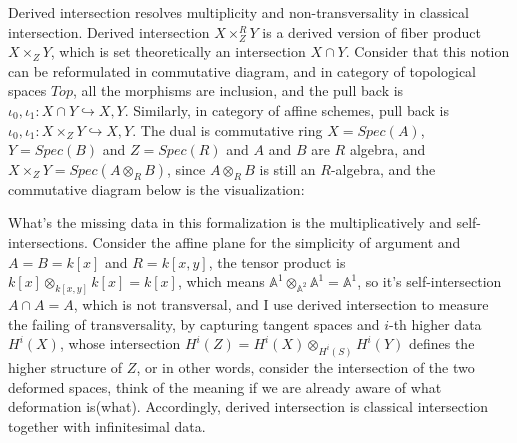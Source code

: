 \documentclass{article}
\begin{document}
\noindent
Derived intersection resolves multiplicity and non-transversality in classical intersection.
Derived intersection $X\times_Z^R Y$ is a derived version of fiber product $X \times_Z Y$, 
which is set theoretically an intersection $X\cap Y$.
Consider that this notion can be reformulated in commutative diagram, and in category of topological spaces $Top$, 
all the morphisms are inclusion, and the pull back is $\iota_0, \iota_1:X\cap Y\hookrightarrow X,Y$. 
Similarly, in category of affine schemes, pull back is $\iota_0, \iota_1:X\times_Z Y\hookrightarrow X,Y$.
The dual is commutative ring $X=Spec(A)$, $Y=Spec(B)$ and $Z=Spec(R)$ and $A$ and $B$ are $R$ algebra,
and $X\times_Z Y = Spec(A\otimes_R B)$, since $A\otimes_R B$ is still an $R$-algebra,
and the commutative diagram below is the visualization: \\

\qquad
{}

\noindent
What's the missing data in this formalization is the multiplicatively and self-intersections.
Consider the affine plane for the simplicity of argument and $A=B=k[x]$ and $R=k[x,y]$,
the tensor product is $k[x]\otimes_{k[x,y]}k[x] = k[x]$, which means $\mathbb{A}^1 \otimes_{\mathbb{A}^2} \mathbb{A}^1=\mathbb{A}^1$,
so it's self-intersection $A\cap A=A$, which is not transversal,
and I use derived intersection to measure the failing of transversality, by capturing tangent spaces and $i$-th higher data $H^i(X)$, 
whose intersection $H^i(Z) = H^i(X) \otimes_{H^i(S)} H^i(Y)$ defines the higher structure of $Z$,
or in other words, consider the intersection of the two deformed spaces, 
think of the meaning if we are already aware of what deformation is(what).
Accordingly, derived intersection is classical intersection together with infinitesimal data.
\end{document}
